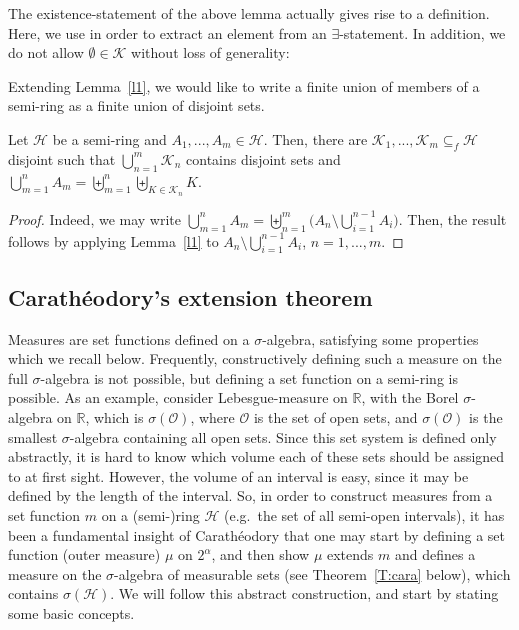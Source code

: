 \documentclass[lean]{AFM}
\begin{document}
\noindent
The existence-statement of the above lemma actually gives rise to a
definition. Here, we use  in order to extract
an element from an $\exists$-statement. In addition, we do not allow
$\emptyset \in \mathcal K$ without loss of generality:


\noindent
Extending Lemma~\ref{l1}, we would like to write a finite union of
members of a semi-ring as a finite union of disjoint sets.

\begin{lemma}\label{l2}
  Let $\mathcal H$ be a semi-ring and $A_1,...,A_m \in \mathcal
  H$. Then, there are $\mathcal K_1,...,\mathcal K_m \subseteq_f
  \mathcal H$ disjoint such that $\bigcup_{n=1}^m \mathcal K_n$
  contains disjoint sets and $\bigcup_{m=1}^n A_m = \biguplus_{m=1}^n
  \biguplus_{K \in \mathcal K_n} K$.
\end{lemma}

\begin{proof}
  Indeed, we may write $ \bigcup_{m=1}^n A_m = \biguplus_{n=1}^m
  \Big(A_n \setminus \bigcup_{i=1}^{n-1}A_i\Big).$ Then, the result
  follows by applying Lemma~\ref{l1} to $A_n \setminus
  \bigcup_{i=1}^{n-1}A_i$, $n=1,...,m$.
\end{proof}

\noindent
\subsection{Carathéodory's extension theorem}
Measures are set functions defined on a $\sigma$-algebra, satisfying
some properties which we recall below. Frequently,
constructively defining such a measure on the full $\sigma$-algebra
is not possible, but defining a set function on a semi-ring is
possible. As an example, consider Lebesgue-measure on $\mathbb R$,
with the Borel $\sigma$-algebra on $\mathbb R$, which is
$\sigma(\mathcal O)$, where $\mathcal O$ is the set of open sets, and
$\sigma(\mathcal O)$ is the smallest $\sigma$-algebra containing all
open sets. Since this set system is defined only abstractly, it is
hard to know which volume each of these sets should be assigned to at
first sight. However, the volume of an interval is easy, since it may
be defined by the length of the interval. So, in order to construct
measures from a set function $m$ on a (semi-)ring $\mathcal H$
(e.g.\ the set of all semi-open intervals), it has been a fundamental
insight of Carathéodory that one may start by defining a set function
(outer measure) $\mu$ on $2^\alpha$, and then show $\mu$ extends $m$
and defines a measure on the $\sigma$-algebra of
  measurable sets (see Theorem~\ref{T:cara} below), which contains
$\sigma(\mathcal H)$.
We will follow this abstract construction, and start by stating some
basic concepts.
\end{document}
